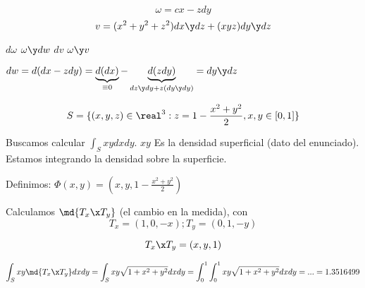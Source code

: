 \begin{problem}[2]

\[\omega = cx - zdy\]
\[v= (x^2+y^2+z^2)dx\y dz + (xyz)dy\y dz\]

\ppart $d\omega$
\ppart $\omega \y dw$
\ppart $dv$
\ppart $\omega \y v$

\solution

\spart $dw = d(dx-zdy) = \underbrace{d(dx)}_{\equiv 0} - \underbrace{d(zdy)}_{dz\y dy + z(dy\y dy)} = dy\y dz$ 

\spart 

\spart 

\spart 


\end{problem}

\begin{problem}[13]
\[S=\{(x,y,z)\in\real^3: z=1-\frac{x^2+y^2}{2},x,y\in[0,1]\}\]

\solution

Buscamos calcular $\int_S xydxdy$. $xy$ Es la densidad superficial (dato del enunciado). Estamos integrando la densidad sobre la superficie.

Definimos: $\Phi(x,y) = \left(x,y,1-\frac{x^2+y^2}{2}\right)$

Calculamos $\md{T_x\x T_y}$ (el cambio en la medida), con
\[T_x = (1,0,-x);T_y=(0,1,-y)\]

\[T_x\x T_y = (x,y,1)\]

\[\int_S xy \md{T_x\x T_y} dxdy = \int_S xy\sqrt{1+x^2+y^2}dxdy = \int_0^1\int_0^1 xy\sqrt{1+x^2+y^2} dxdy = ... = 1.3516499\]

\end{problem}

